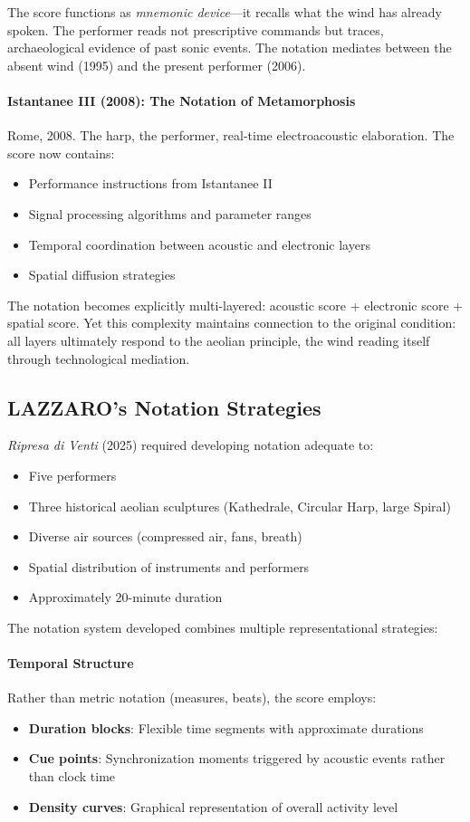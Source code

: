 The score functions as \emph{mnemonic device}---it recalls what the wind has 
already spoken. The performer reads not prescriptive commands but traces, 
archaeological evidence of past sonic events. The notation mediates between 
the absent wind (1995) and the present performer (2006).

\paragraph{Istantanee III (2008): The Notation of Metamorphosis}
Rome, 2008. The harp, the performer, real-time electroacoustic elaboration. 
The score now contains:
\begin{itemize}
  \item Performance instructions from Istantanee II
  \item Signal processing algorithms and parameter ranges
  \item Temporal coordination between acoustic and electronic layers
  \item Spatial diffusion strategies
\end{itemize}

The notation becomes explicitly multi-layered: acoustic score + electronic 
score + spatial score. Yet this complexity maintains connection to the original 
condition: all layers ultimately respond to the aeolian principle, the wind 
reading itself through technological mediation.

\subsection{LAZZARO's Notation Strategies}

\emph{Ripresa di Venti} (2025) required developing notation adequate to:
\begin{itemize}
  \item Five performers
  \item Three historical aeolian sculptures (Kathedrale, Circular Harp, large 
  Spiral)
  \item Diverse air sources (compressed air, fans, breath)
  \item Spatial distribution of instruments and performers
  \item Approximately 20-minute duration
\end{itemize}

The notation system developed combines multiple representational strategies:

\paragraph{Temporal Structure}
Rather than metric notation (measures, beats), the score employs:
\begin{itemize}
  \item \textbf{Duration blocks}: Flexible time segments with approximate 
  durations
  \item \textbf{Cue points}: Synchronization moments triggered by acoustic 
  events rather than clock time
  \item \textbf{Density curves}: Graphical representation of overall activity 
  level
\end{itemize}

